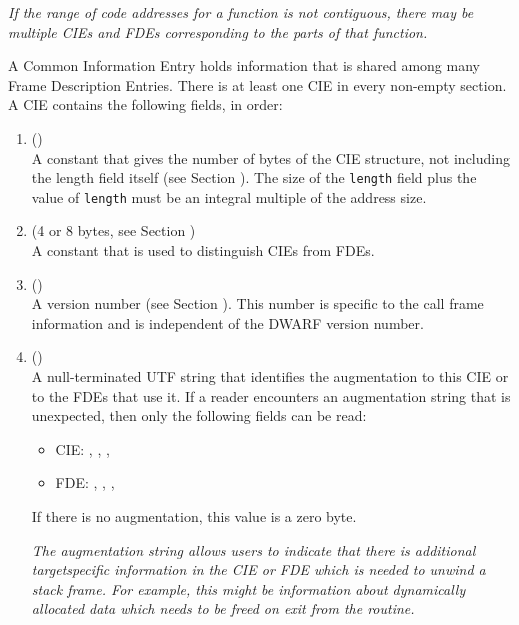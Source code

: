 \textit{If the range of code addresses for a function is not
contiguous, there may be multiple CIEs and FDEs corresponding
to the parts of that function.}

A Common Information Entry holds information that is shared
among many Frame Description Entries. There is at least one
CIE in every non-empty \dotdebugframe{} section. A CIE contains
the following fields, in order:
\begin{enumerate}[1. ]
\item \HFNlength{} ()  \\
A constant that gives the number of bytes of the CIE structure,
not including the length field itself 
(see Section ). 
The
size of the \texttt{length} field plus the value of \texttt{length} must be an
integral multiple of the address size.

\item  \HFNCIEid{} (4 or 8 bytes, see Section ) \\
A constant that is used to distinguish CIEs from FDEs.

\item  \HFNversion{} (\HFTubyte) \\
A version number 
(see Section ). 
This number is specific to the call frame information
and is independent of the DWARF version number.

\item  \HFNaugmentation{} (\HFTaugstring) \\
A null-terminated UTF string that identifies the augmentation
to this CIE or to the FDEs that use it. If a reader encounters
an augmentation string that is unexpected, then only the
following fields can be read:


\begin{itemize}

\item CIE: \HFNlength, \HFNCIEid, \HFNversion, \HFNaugmentation

\item FDE: \HFNlength, \HFNCIEpointer, \HFNinitiallocation, \HFNaddressrange

\end{itemize}
If there is no augmentation, this value is a zero byte.

\textit{The augmentation string allows users to indicate that there
is additional target\dash specific information in the CIE or FDE
which is needed to unwind a stack frame. For example, this
might be information about dynamically allocated data which
needs to be freed on exit from the routine.}


\end{enumerate}
